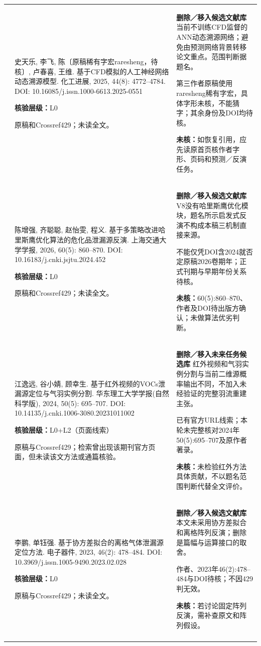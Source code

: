 \begin{longtable}{@{}>{\raggedright\arraybackslash}p{0.7cm}>{\raggedright\arraybackslash}p{7.0cm}>{\raggedright\arraybackslash}p{7.8cm}@{}}
21 & 史天乐, 李飞, 陈〔原稿稀有字宏raresheng，待核〕, 卢春喜, 王维. 基于CFD模拟的人工神经网络动态溯源模型. 化工进展, 2025, 44(8): 4772–4784. DOI: 10.16085/j.issn.1000-6613.2025-0551\par\textbf{核验层级：}L0\par 原稿和Crossref429；未读全文。 & \textbf{删除／移入候选文献库} 当前不训练CFD监督的ANN动态溯源网络；避免由预测网络背景转移论文重点。范围判断据题名。\par 第三作者原稿使用raresheng稀有字宏，具体字形未核，不能猜字；其余身份及DOI均待核。\par\textbf{未核：}如恢复引用，应先读原首页核作者字形、页码和预测／反演任务。 \\\addlinespace[6pt]
22 & 陈增强, 齐聪聪, 赵怡雯, 程义. 基于多策略改进哈里斯鹰优化算法的危化品泄漏源反演. 上海交通大学学报, 2026, 60(5): 860–870. DOI: 10.16183/j.cnki.jsjtu.2024.452\par\textbf{核验层级：}L0\par 原稿和Crossref429；未读全文。 & \textbf{删除／移入候选文献库} V8没有哈里斯鹰优化模块，题名所示启发式反演不构成本稿三机制直接来源。\par 不能仅凭DOI含2024就否定原稿2026卷期年；正式刊期与早期年份关系待核。\par\textbf{未核：}60(5):860–870、作者及DOI待出版方确认；未做算法优劣判断。 \\\addlinespace[6pt]
23 & 江逸远, 谷小婧, 顾幸生. 基于红外视频的VOCs泄漏源定位与气羽实例分割. 华东理工大学学报(自然科学版), 2024, 50(5): 695–707. DOI: 10.14135/j.cnki.1006-3080.20231011002\par\textbf{核验层级：}L0+L2（页面线索）\par 原稿与Crossref429；检索曾出现该期刊官方页面，但未读该文方法或通篇核验。 & \textbf{删除／移入未来任务候选库} 红外视频和气羽实例分割与当前二维源概率输出不同，不加入未经验证的完整羽流重建主张。\par 已有官方URL线索；本轮未完整核对2024年50(5):695–707及原作者著录。\par\textbf{未核：}未检验红外方法具体贡献，不以题名范围判断代替全文评价。 \\\addlinespace[6pt]
24 & 李鹏, 单钰强. 基于协方差拟合的离格气体泄漏源定位方法. 电子器件, 2023, 46(2): 478–484. DOI: 10.3969/j.issn.1005-9490.2023.02.028\par\textbf{核验层级：}L0\par 原稿与Crossref429；未读全文。 & \textbf{删除／移入候选文献库} 本文未采用协方差拟合和离格阵列反演；删除是篇幅与运算接口的取舍。\par 作者、2023年46(2):478–484与DOI待核；不因429判无效。\par\textbf{未核：}若讨论固定阵列反演，需补查原文和阵列假设。 \\\addlinespace[6pt]

\end{longtable}
